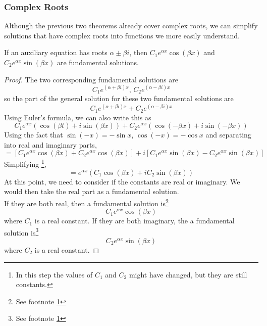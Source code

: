 \subsubsection{Complex Roots}
\noindent
Although the previous two theorems already cover complex roots, we can simplify solutions that have complex roots into functions we more easily understand.\\

\begin{theorem}
	If an auxiliary equation has roots $\alpha \pm \beta i$, then $C_1e^{\alpha x}\cos{(\beta x)}$ and  $C_2e^{\alpha x}\sin{(\beta x)}$ are fundamental solutions.
\end{theorem}
\begin{proof}
	The two corresponding fundamental solutions are
	\begin{equation*}
		C_1e^{(\alpha + \beta i)x} \text{, } C_2e^{(\alpha - \beta i)x}
	\end{equation*}
	so the part of the general solution for these two fundamental solutions are
	\begin{equation*}
		C_1e^{(\alpha + \beta i)x} + C_2e^{(\alpha - \beta i)x}
	\end{equation*}
	Using Euler's formula, we can also write this as
	\begin{equation*}
		C_1 e^{\alpha x}\left( \cos{(\beta t)} + i\sin{(\beta x)} \right) + C_2e^{\alpha x}\left( \cos{(-\beta x)} + i\sin{(-\beta x)} \right)
	\end{equation*}
	Using the fact that $\sin{(-x)} = -\sin{x}$, $\cos{(-x)} = -\cos{x}$ and separating into real and imaginary parts,
	\begin{equation*}
		 = \left[ C_1e^{\alpha x}\cos{(\beta x)} + C_2e^{\alpha x}\cos{(\beta x)} \right] + i\left[ C_1e^{\alpha x}\sin{(\beta x)} - C_2e^{\alpha x}\sin{(\beta x)} \right]
	\end{equation*}
	Simplifying \footnote{\label{note1}In this step the values of $C_1$ and $C_2$ might have changed, but they are still constants.},
	\begin{equation*}
		= e^{\alpha x}\left(C_1\cos{(\beta x)} + iC_2\sin{(\beta x)}\right)
	\end{equation*}
	At this point, we need to consider if the constants are real or imaginary. We would then take the real part as a fundamental solution.\\
	If they are both real, then a fundamental solution is\footnote{See footnote \ref{note1}}
	\begin{equation*}
		C_1e^{\alpha x}\cos{(\beta x)}
	\end{equation*}
	where $C_1$ is a real constant.
	If they are both imaginary, the a fundamental solution is\footnote{See footnote \ref{note1}}
	\begin{equation*}
		C_2e^{\alpha x}\sin{(\beta x)}
	\end{equation*}
	where $C_2$ is a real constant.
\end{proof}

